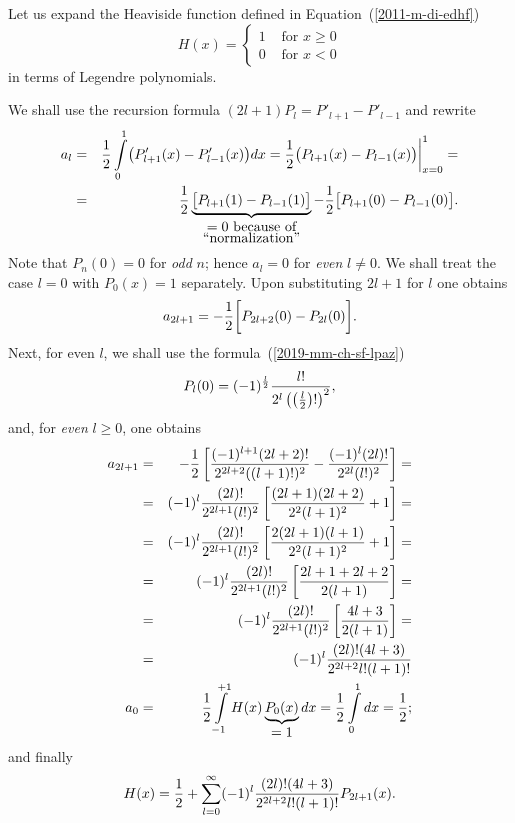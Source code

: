 {
\color{blue}
\bexample
Let us expand the Heaviside function defined in Equation~(\ref{2011-m-di-edhf})
\begin{equation}
H(x)
=
\left\{
\begin{array}{rl}
1&\textrm{ for } x\ge  0\\
0&\textrm{ for } x <  0
\end{array}
\right.
\end{equation}
in terms of Legendre polynomials.

We shall use the recursion formula $(2l+1)P_l=P'_{l+1}-P'_{l-1}$ and rewrite
\begin{eqnarray*}
 a_l &=& {1\over 2}\int\limits_0^1\bigl(P'_{l+1}(x)-
              P'_{l-1}(x)\bigr)dx=
              {1\over 2}\bigl(P_{l+1}(x)-P_{l-1}(x)\bigr)
              \biggr|_{x=0}^1=\\
            &=& {1\over 2}\underbrace{\bigl[P_{l+1}(1)-P_{l-1}(1)\bigr]}
                _{\mbox{$=0$ because of}\atop \mbox{``normalization''}}-
                {1\over 2}\bigl[P_{l+1}(0)-P_{l-1}(0)\bigr]
.
\end{eqnarray*}
Note that $P_n(0)=0$ for {\em odd} $n$; hence $  a_l=0$ for
{\em even} $l\ne0$. We shall treat the case $l=0$ with $P_0(x)=1$ separately.
Upon substituting $2l+1$ for $l$ one obtains
$$
   a_{2l+1}=-{1\over 2}\biggl[P_{2l+2}(0)-P_{2l}(0)\biggr].
$$
Next, for even $l$, we shall use the formula~(\ref{2019-mm-ch-sf-lpaz})
$$
   P_l(0)=(-1)^{l\over 2}{l!\over
2^l\left(\left({l\over2}\right)!\right)^2},
$$
and, for {\em even} $l\geq 0$,  one obtains
\begin{eqnarray*}
   a_{2l+1}&=&-{1\over 2}\left[{(-1)^{l+1}(2l+2)!\over 2^{2l+2}((l+1)!)^2}
              -{(-1)^l(2l)!\over 2^{2l}(l!)^2}\right]=\\
   &=&(-1)^l{(2l)!\over 2^{2l+1}(l!)^2}\left[{(2l+1)(2l+2)\over 2^2(l+1)^2}
               +1\right]=\\
   &=&(-1)^l{(2l)!\over 2^{2l+1}(l!)^2}\left[{2(2l+1)(l+1)\over 2^2(l+1)^2}
               +1\right]=\\
   &=&(-1)^l{(2l)!\over 2^{2l+1}(l!)^2}\left[{2l+1+2l+2\over 2(l+1)}\right]=\\
   &=&(-1)^l{(2l)!\over 2^{2l+1}(l!)^2}\left[{4l+3\over2(l+1)}\right]=\\
   &=&(-1)^l{(2l)!(4l+3)\over 2^{2l+2}l!(l+1)!}\\
   a_0&=&{1\over 2}\int\limits_{-1}^{+1} H (x)\underbrace{P_0(x)}_
               {\mbox{$=1$}}dx={1\over 2}\int\limits_0^1dx={1\over 2};
\end{eqnarray*}
and finally
$$
  H (x)={1\over 2}+\sum_{l=0}^\infty
   (-1)^l{(2l)!(4l+3)\over2^{2l+2}l!(l+1)!}P_{2l+1}(x).
$$
\eexample
}


